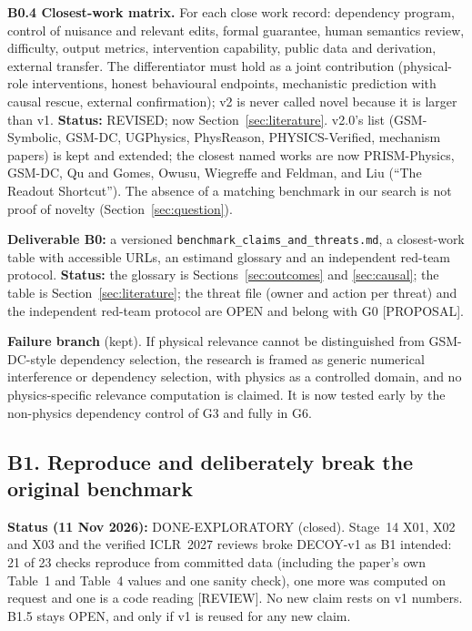 \documentclass[10pt,a4paper]{article}
\newcommand{\tg}[1]{\textsc{[#1]}}
\begin{document}
\textbf{B0.4 Closest-work matrix.} For each close work record: dependency program, control of nuisance and
relevant edits, formal guarantee, human semantics review, difficulty, output metrics, intervention capability,
public data and derivation, external transfer. The differentiator must hold as a joint contribution
(physical-role interventions, honest behavioural endpoints, mechanistic prediction with causal rescue, external
confirmation); v2 is never called novel because it is larger than v1.
\textbf{Status:} REVISED; now Section~\ref{sec:literature}. v2.0's list (GSM-Symbolic, GSM-DC, UGPhysics,
PhysReason, PHYSICS-Verified, mechanism papers) is kept and extended; the closest named works are now
PRISM-Physics, GSM-DC, Qu and Gomes, Owusu, Wiegreffe and Feldman, and Liu (``The Readout Shortcut''). The absence
of a matching benchmark in our search is not proof of novelty (Section~\ref{sec:question}).

\textbf{Deliverable B0:} a versioned \texttt{benchmark\_claims\_and\_threats.md}, a closest-work table with
accessible URLs, an estimand glossary and an independent red-team protocol. \textbf{Status:} the glossary is
Sections~\ref{sec:outcomes} and \ref{sec:causal}; the table is Section~\ref{sec:literature}; the threat file
(owner and action per threat) and the independent red-team protocol are OPEN and belong with G0
\tg{PROPOSAL}.

\textbf{Failure branch} (kept). If physical relevance cannot be distinguished from GSM-DC-style dependency
selection, the research is framed as generic numerical interference or dependency selection, with physics as a
controlled domain, and no physics-specific relevance computation is claimed. It is now tested early by the
non-physics dependency control of G3 and fully in G6.

\subsection{B1. Reproduce and deliberately break the original benchmark}\label{sec:phaseB-B1}

\textbf{Status (11 Nov 2026):} DONE-EXPLORATORY (closed). Stage~14 X01, X02 and X03 and the verified ICLR~2027
reviews broke DECOY-v1 as B1 intended: 21 of 23 checks reproduce from committed data (including the paper's own Table~1 and Table~4 values and one
sanity check), one more was computed on request and one is a code reading \tg{REVIEW}. No new claim rests on v1 numbers. B1.5 stays OPEN,
and only if v1 is reused for any new claim.
\end{document}
